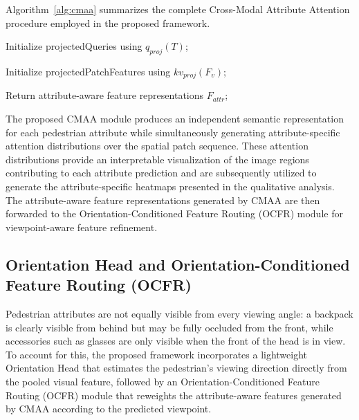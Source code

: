 \documentclass{ieeeaccess}
\begin{document}
Algorithm~\ref{alg:cmaa} summarizes the complete Cross-Modal Attribute Attention procedure employed in the proposed framework.
\begin{algorithm}[H]
\caption{Cross-Modal Attribute Attention (CMAA)}
\label{alg:cmaa}

Initialize projectedQueries using $q_{proj}(T)$;

Initialize projectedPatchFeatures using $kv_{proj}(F_v)$;


Return attribute-aware feature representations $F_{attr}$;

\end{algorithm}

The proposed CMAA module produces an independent semantic representation for each pedestrian attribute while simultaneously generating attribute-specific attention distributions over the spatial patch sequence. These attention distributions provide an interpretable visualization of the image regions contributing to each attribute prediction and are subsequently utilized to generate the attribute-specific heatmaps presented in the qualitative analysis. The attribute-aware feature representations generated by CMAA are then forwarded to the Orientation-Conditioned Feature Routing (OCFR) module for viewpoint-aware feature refinement.

\subsection{Orientation Head and Orientation-Conditioned Feature Routing (OCFR)}

Pedestrian attributes are not equally visible from every viewing angle: a backpack is clearly visible from behind but may be fully occluded from the front, while accessories such as glasses are only visible when the front of the head is in view. To account for this, the proposed framework incorporates a lightweight Orientation Head that estimates the pedestrian's viewing direction directly from the pooled visual feature, followed by an Orientation-Conditioned Feature Routing (OCFR) module that reweights the attribute-aware features generated by CMAA according to the predicted viewpoint.
\end{document}
